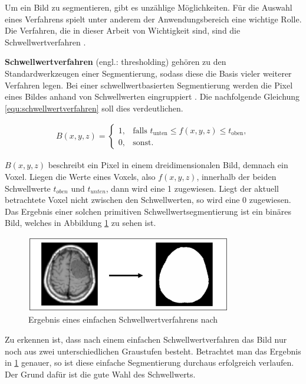 Um ein Bild zu segmentieren, gibt es unzählige Möglichkeiten. Für die Auswahl
eines Verfahrens spielt unter anderem der Anwendungsbereich eine wichtige Rolle.
Die Verfahren, die in dieser Arbeit von Wichtigkeit sind, sind die Schwellwertverfahren
\citep[vgl.][S.~361]{lehmann2013bildverarbeitung}.

\pagebreak

\textbf{Schwellwertverfahren} (engl.: thresholding) gehören zu den
Standardwerkzeugen einer Segmentierung, sodass diese die Basis vieler weiterer Verfahren
legen. Bei einer schwellwertbasierten Segmentierung werden die Pixel eines
Bildes anhand von Schwellwerten eingruppiert \citep[vgl.][S.~96]{handels2000}.
Die nachfolgende Gleichung \ref{equ:schwellwertverfahren} soll dies
verdeutlichen.

\begin{align}
	\label{equ:schwellwertverfahren}B(x, y, z) = \begin{cases}1,&\text{falls }t_{\text{unten}}\leq f(x, y, z) \leq t_{\text{oben}}, \\ 0,&\text{sonst}.\end{cases}
\end{align}

$B(x, y, z)$ beschreibt ein Pixel in einem dreidimensionalen Bild, demnach ein
Voxel. Liegen die Werte eines Voxels, also $f(x, y, z)$, innerhalb der beiden Schwellwerte
$t_{oben}$ und $t_{unten}$, dann wird eine 1 zugewiesen. Liegt der aktuell betrachtete
Voxel nicht zwischen den Schwellwerten, so wird eine 0 zugewiesen. Das Ergebnis einer
solchen primitiven Schwellwertsegmentierung ist ein binäres Bild, welches in
Abbildung \ref{fig:binäres_schwellwertverfahren} zu sehen ist.

\begin{figure}[h]
	\centering
	\includegraphics[width=0.8\textwidth]{img/beispiel_schwellwertverfahren.jpg}
	\caption{Ergebnis eines einfachen Schwellwertverfahrens nach \citet[S.~96]{handels2000}}
	\label{fig:binäres_schwellwertverfahren}
\end{figure}

Zu erkennen ist, dass nach einem einfachen Schwellwertverfahren das Bild nur
noch aus zwei unterschiedlichen Graustufen besteht. Betrachtet man das Ergebnis in
\ref{fig:binäres_schwellwertverfahren} genauer, so ist diese einfache
Segmentierung durchaus erfolgreich verlaufen. Der Grund dafür ist die gute Wahl des
Schwellwerts.


